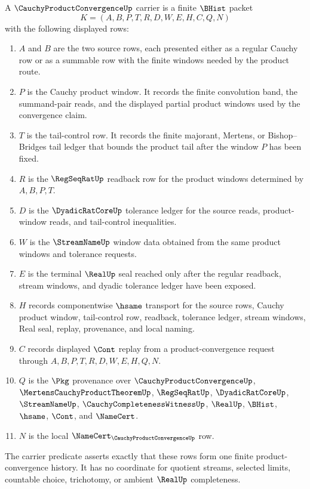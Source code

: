 \begin{definition}
\label{def:cauchy-product-convergence-carrier}
A $\CauchyProductConvergenceUp$ carrier is a finite $\BHist$ packet
$$
K=(A,B,P,T,R,D,W,E,H,C,Q,N)
$$
with the following displayed rows:
\begin{enumerate}
\item $A$ and $B$ are the two source rows, each presented either as a regular Cauchy row or as a summable row with the finite windows needed by the product route.
\item $P$ is the Cauchy product window. It records the finite convolution band, the summand-pair reads, and the displayed partial product windows used by the convergence claim.
\item $T$ is the tail-control row. It records the finite majorant, Mertens, or Bishop--Bridges tail ledger that bounds the product tail after the window $P$ has been fixed.
\item $R$ is the $\RegSeqRatUp$ readback row for the product windows determined by $A,B,P,T$.
\item $D$ is the $\DyadicRatCoreUp$ tolerance ledger for the source reads, product-window reads, and tail-control inequalities.
\item $W$ is the $\StreamNameUp$ window data obtained from the same product windows and tolerance requests.
\item $E$ is the terminal $\RealUp$ seal reached only after the regular readback, stream windows, and dyadic tolerance ledger have been exposed.
\item $H$ records componentwise $\hsame$ transport for the source rows, Cauchy product window, tail-control row, readback, tolerance ledger, stream windows, Real seal, replay, provenance, and local naming.
\item $C$ records displayed $\Cont$ replay from a product-convergence request through $A,B,P,T,R,D,W,E,H,Q,N$.
\item $Q$ is the $\Pkg$ provenance over $\CauchyProductConvergenceUp$, $\MertensCauchyProductTheoremUp$, $\RegSeqRatUp$, $\DyadicRatCoreUp$, $\StreamNameUp$, $\CauchyCompletenessWitnessUp$, $\RealUp$, $\BHist$, $\hsame$, $\Cont$, and $\NameCert$.
\item $N$ is the local $\NameCert_{\CauchyProductConvergenceUp}$ row.
\end{enumerate}
The carrier predicate asserts exactly that these rows form one finite product-convergence history. It has no coordinate for quotient streams, selected limits, countable choice, trichotomy, or ambient $\RealUp$ completeness.
\end{definition}

